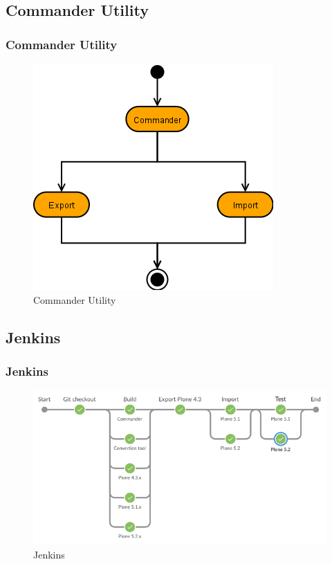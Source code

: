 \documentclass[aspectratio=169]{beamer}
\begin{document}
\subsection{Commander Utility}
\begin{frame}
  \frametitle{Commander Utility}
  \begin{figure}
    \includegraphics[height=.7\textheight]{./img/006_-_Commander_Utility.png}
    \caption{Commander Utility}
  \end{figure}
\end{frame}

\subsection{Jenkins}
\begin{frame}
  \frametitle{Jenkins}
  \begin{figure}
    \includegraphics[height=.7\textheight]{./img/007_-_Jenkins.png}
    \caption{Jenkins}
  \end{figure}
\end{frame}
\end{document}

